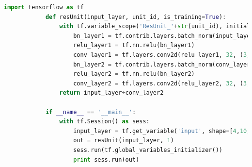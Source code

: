             \begin{lstlisting}[language = Python]
            import tensorflow as tf
            def resUnit(input_layer, unit_id, is_training=True):
                with tf.variable_scope('ResUnit_'+str(unit_id), initializer=tf.random_normal_initializer()):
                    bn_layer1 = tf.contrib.layers.batch_norm(input_layer, is_training=is_training)
                    relu_layer1 = tf.nn.relu(bn_layer1)
                    conv_layer1 = tf.layers.conv2d(relu_layer1, 32, (3,3), padding='same')
                    bn_layer2 = tf.contrib.layers.batch_norm(conv_layer1, is_training=is_training)
                    relu_layer2 = tf.nn.relu(bn_layer2)
                    conv_layer2 = tf.layers.conv2d(relu_layer2, 32, (3,3), padding='same')
                return input_layer+conv_layer2

            if __name__ == '__main__':
                with tf.Session() as sess:
                    input_layer = tf.get_variable('input', shape=[4,10,10,32], dtype=tf.float32)
                    out = resUnit(input_layer, 1)
                    sess.run(tf.global_variables_initializer())
                    print sess.run(out)
            \end{lstlisting}

